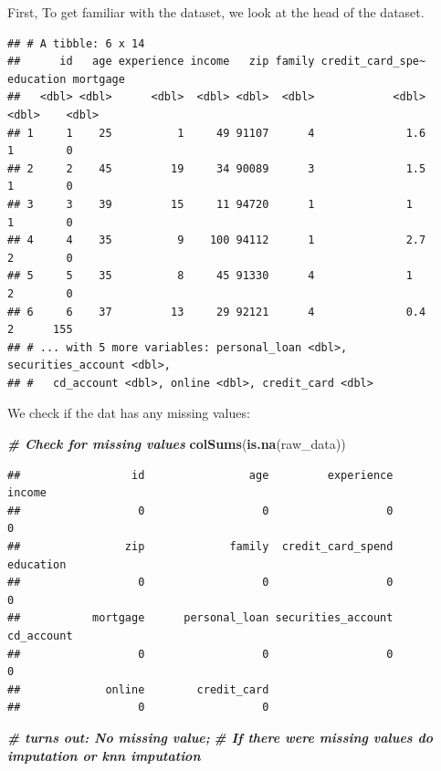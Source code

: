 \documentclass[
]{article}
\newenvironment{Shaded}{\begin{snugshade}}{\end{snugshade}}
\newcommand{\CommentTok}[1]{\textcolor[rgb]{0.00,0.40,1.00}{\textbf{\textit{#1}}}}
\newcommand{\KeywordTok}[1]{\textcolor[rgb]{0.26,0.66,0.93}{\textbf{#1}}}
\newcommand{\NormalTok}[1]{\textcolor[rgb]{0.74,0.68,0.62}{#1}}
\begin{document}
First, To get familiar with the dataset, we look at the head of the
dataset.

\begin{verbatim}
## # A tibble: 6 x 14
##      id   age experience income   zip family credit_card_spe~ education mortgage
##   <dbl> <dbl>      <dbl>  <dbl> <dbl>  <dbl>            <dbl>     <dbl>    <dbl>
## 1     1    25          1     49 91107      4              1.6         1        0
## 2     2    45         19     34 90089      3              1.5         1        0
## 3     3    39         15     11 94720      1              1           1        0
## 4     4    35          9    100 94112      1              2.7         2        0
## 5     5    35          8     45 91330      4              1           2        0
## 6     6    37         13     29 92121      4              0.4         2      155
## # ... with 5 more variables: personal_loan <dbl>, securities_account <dbl>,
## #   cd_account <dbl>, online <dbl>, credit_card <dbl>
\end{verbatim}

We check if the dat has any missing values:

\begin{Shaded}
\begin{Highlighting}[]
\CommentTok{# Check for missing values}
\KeywordTok{colSums}\NormalTok{(}\KeywordTok{is.na}\NormalTok{(raw_data))}
\end{Highlighting}
\end{Shaded}

\begin{verbatim}
##                 id                age         experience             income 
##                  0                  0                  0                  0 
##                zip             family  credit_card_spend          education 
##                  0                  0                  0                  0 
##           mortgage      personal_loan securities_account         cd_account 
##                  0                  0                  0                  0 
##             online        credit_card 
##                  0                  0
\end{verbatim}

\begin{Shaded}
\begin{Highlighting}[]
\CommentTok{# turns out: No missing value; }
\CommentTok{# If there were missing values do imputation or knn imputation}
\end{Highlighting}
\end{Shaded}
\end{document}
